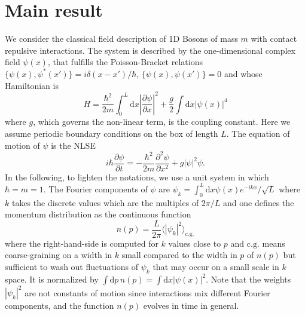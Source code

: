 \documentclass[submission,Phys,10pt]{SciPost}%
\begin{document}
\section{Main result}  
We consider the classical field description of 1D Bosons of mass $m$
with contact repulsive interactions.
The system is described by
 the one-dimensional complex field $\psi(x)$,
that fulfills the Poisson-Bracket relations $\{\psi(x),\psi^*(x')\}=i\delta(x-x')/\hbar$, $\{\psi(x),\psi(x')\}=0$  and
 whose Hamiltonian is
 \begin{equation}
   H=\frac{\hbar^2}{2m}\int_0^L \mathrm{d}x \left |\frac{\partial \psi}{\partial x}\right |^2
   + \frac{g}{2} \int \mathrm{d}x \left | \psi(x)\right |^4
   \end{equation}
 where $g$, which governs the non-linear term, is the coupling constant. Here we assume periodic
 boundary conditions on the box of length $L$.
 The equation of motion of $\psi$ is the NLSE
 \begin{equation}
 \label{eq.GPE}
   i\hbar \frac{\partial \psi}{\partial t} = -\frac{\hbar^2}{2m} \frac{\partial^2 \psi}{\partial x^2} + g |\psi|^2 \psi.
 \end{equation}
In the following, to lighten the notations, we use a unit 
system in which $\hbar=m=1$.
The Fourier components of $\psi$ are
$\psi_k=\int_0^L \mathrm{d}x \psi(x)e^{-ikx}/\sqrt{L}$
where $k$ takes the discrete values which are the multiples of $2\pi/L$ and  one defines the momentum
distribution as the continuous function
\begin{equation}
n(p)=  \frac{L}{2\pi}\langle |\psi_{k}|^2\rangle_{\mathrm{c.g.}}
\end{equation}
where the right-hand-side is computed for $k$ values close to $p$ and 
$\mathrm{c.g.}$ means coarse-graining on a width in $k$ small compared to the
width in $p$ of $n(p)$ but sufficient to wash out 
fluctuations of $\psi_k$  that may occur on a small scale in $k$ space. 
It is normalized by $\int \mathrm{d}p\, n(p)=\int \mathrm{d}x |\psi(x)|^2$. Note that
the weights $|\psi_k|^2$ are not constants of motion since interactions 
mix different Fourier components,
and the function $n(p)$ 
evolves in time in general. 
\end{document}

